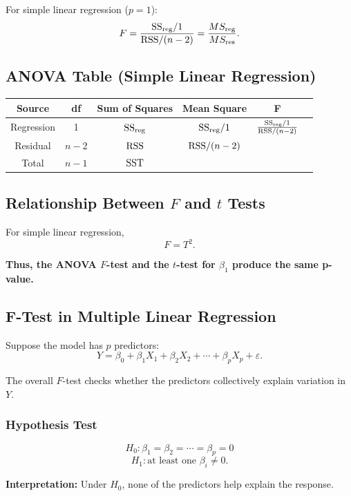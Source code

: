 For simple linear regression ($p=1$):
\[
F =
\frac{\mathrm{SS}_{\mathrm{reg}}/1}{\mathrm{RSS}/(n-2)}
=
\frac{MS_{\text{reg}}}{MS_{\text{res}}}.
\]

\subsection{ANOVA Table (Simple Linear Regression)}

\begin{center}
\begin{tabular}{cccccc}
\hline
Source & df & Sum of Squares & Mean Square & F \\
\hline
Regression & 1 & $\mathrm{SS}_{\mathrm{reg}}$ & $\mathrm{SS}_{\mathrm{reg}}/1$ & $\frac{\mathrm{SS}_{\mathrm{reg}}/1}{\mathrm{RSS}/(n-2)}$ \\
Residual & $n-2$ & $\mathrm{RSS}$ & $\mathrm{RSS}/(n-2)$ & \\
Total & $n-1$ & $\mathrm{SST}$ & & \\
\hline
\end{tabular}
\end{center}

\subsection{Relationship Between $F$ and $t$ Tests}

For simple linear regression,
\[
F = T^2.
\]

\textbf{Thus, the ANOVA $F$-test and the $t$-test for $\beta_1$ produce the same p-value.}

\pagebreak

\subsection{F-Test in Multiple Linear Regression}

Suppose the model has $p$ predictors:
\[
Y = \beta_0 + \beta_1 X_1 + \beta_2 X_2 + \cdots + \beta_p X_p + \varepsilon.
\]

The overall $F$-test checks whether the predictors collectively explain variation in $Y$.

\subsubsection{Hypothesis Test}

\[
H_0 : \beta_1 = \beta_2 = \cdots = \beta_p = 0
\]
\[
H_1 : \text{at least one } \beta_i \neq 0.
\]

\textbf{Interpretation:} Under $H_0$, none of the predictors help explain the response.

